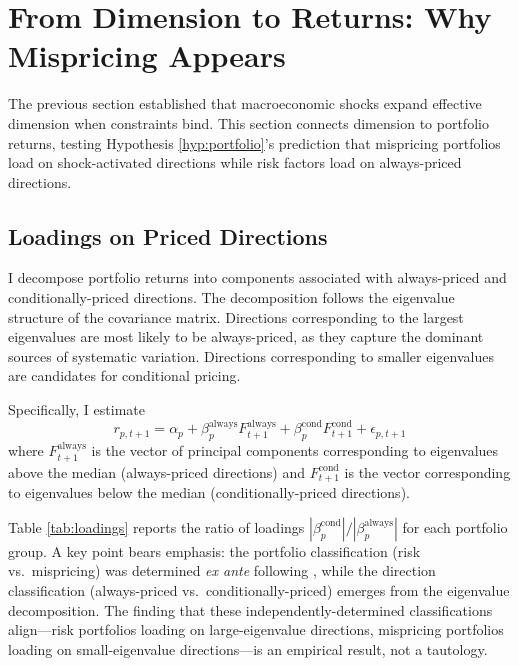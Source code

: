 \documentclass[12pt,letterpaper]{article}
\theoremstyle{plain}
\theoremstyle{definition}
\begin{document}
\section{From Dimension to Returns: Why Mispricing Appears}\label{sec:returns}

The previous section established that macroeconomic shocks expand effective dimension when constraints bind. This section connects dimension to portfolio returns, testing Hypothesis \ref{hyp:portfolio}'s prediction that mispricing portfolios load on shock-activated directions while risk factors load on always-priced directions.

\subsection{Loadings on Priced Directions}\label{subsec:loadings}

I decompose portfolio returns into components associated with always-priced and conditionally-priced directions. The decomposition follows the eigenvalue structure of the covariance matrix. Directions corresponding to the largest eigenvalues are most likely to be always-priced, as they capture the dominant sources of systematic variation. Directions corresponding to smaller eigenvalues are candidates for conditional pricing.

Specifically, I estimate
\begin{equation}\label{eq:loading_regression}
r_{p,t+1} = \alpha_p + \beta_p^{\text{always}} F^{\text{always}}_{t+1} + \beta_p^{\text{cond}} F^{\text{cond}}_{t+1} + \epsilon_{p,t+1}
\end{equation}
where $F^{\text{always}}_{t+1}$ is the vector of principal components corresponding to eigenvalues above the median (always-priced directions) and $F^{\text{cond}}_{t+1}$ is the vector corresponding to eigenvalues below the median (conditionally-priced directions).

Table \ref{tab:loadings} reports the ratio of loadings $|\beta_p^{\text{cond}}| / |\beta_p^{\text{always}}|$ for each portfolio group. A key point bears emphasis: the portfolio classification (risk vs.\ mispricing) was determined \textit{ex ante} following \cite{stambaugh2015mispricing}, while the direction classification (always-priced vs.\ conditionally-priced) emerges from the eigenvalue decomposition. The finding that these independently-determined classifications align---risk portfolios loading on large-eigenvalue directions, mispricing portfolios loading on small-eigenvalue directions---is an empirical result, not a tautology.
\end{document}
